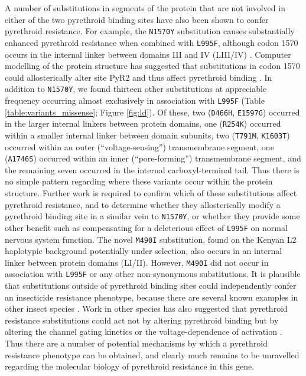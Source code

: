 \documentclass[a4paper,11pt,abstracton,hidelinks]{scrartcl}
\begin{document}
%
A number of substitutions in segments of the protein that are not involved in either of the two pyrethroid binding sites have also been shown to confer pyrethroid resistance.
%
For example, the \texttt{N1570Y} substitution causes substantially enhanced pyrethroid resistance when combined with \texttt{L995F}, although codon 1570 occurs in the internal linker between domains III and IV (LIII/IV) \cite{Du2013}.
%
Computer modelling of the protein structure has suggested that substitutions in codon 1570 could allosterically alter site PyR2 and thus affect pyrethroid binding \cite{Du2013}.
%
In addition to \texttt{N1570Y}, we found thirteen other substitutions at appreciable frequency occurring almost exclusively in association with \texttt{L995F} (Table \ref{table:variants_missense}; Figure \ref{fig:ld}).
%
Of these, two (\texttt{D466H}, \texttt{E1597G}) occurred in the larger internal linkers between protein domains, one (\texttt{R254K}) occurred within a smaller internal linker between domain subunits, two (\texttt{T791M}, \texttt{K1603T}) occurred within an outer (``voltage-sensing'') transmembrane segment, one (\texttt{A1746S}) occurred within an inner (``pore-forming'') transmembrane segment, and the remaining seven occurred in the internal carboxyl-terminal tail.
%
Thus there is no simple pattern regarding where these variants occur within the protein structure.
%
Further work is required to confirm which of these substitutions affect pyrethroid resistance, and to determine whether they allosterically modify a pyrethroid binding site in a similar vein to \texttt{N1570Y}, or whether they provide some other benefit such as compensating for a deleterious effect of \texttt{L995F} on normal nervous system function.
%
The novel \texttt{M490I} substitution, found on the Kenyan L2 haplotypic background potentially under selection, also occurs in an internal linker between protein domains (LI/II).
%
However, \texttt{M490I} did not occur in association with \texttt{L995F} or any other non-synonymous substitutions.
%
It is plausible that substitutions outside of pyrethroid binding sites could independently confer an insecticide resistance phenotype, because there are several known examples in other insect species \cite{Dong2014}.
%
Work in other species has also suggested that pyrethroid resistance substitutions could act not by altering pyrethroid binding but by altering the channel gating kinetics or the voltage-dependence of activation \cite{Dong2014}.
%
Thus there are a number of potential mechanisms by which a pyrethroid resistance phenotype can be obtained, and clearly much remains to be unravelled regarding the molecular biology of pyrethroid resistance in this gene.
\end{document}
